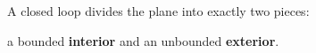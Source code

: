 \documentclass[preview]{standalone}
\begin{document}
\begin{center}
A closed loop divides the plane into exactly two pieces:\\a bounded \textbf{interior} and an unbounded \textbf{exterior}.
\end{center}
\end{document}
